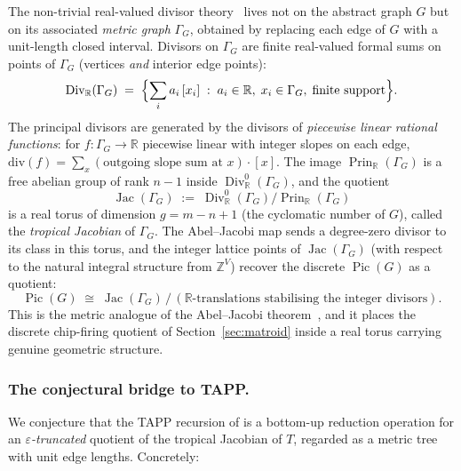 \documentclass[11pt]{article}
\newcommand{\Z}{\mathbb{Z}}
\newcommand{\R}{\mathbb{R}}
\newcommand{\Div}{\operatorname{Div}^0}
\begin{document}
The non-trivial real-valued divisor theory~\cite{baker2007riemann,mikhalkin2008tropical}
lives not on the abstract graph $G$ but on its associated
\emph{metric graph} $\Gamma_G$, obtained by replacing each edge of $G$
with a unit-length closed interval. Divisors on $\Gamma_G$ are
finite real-valued formal sums on points of $\Gamma_G$
(vertices \emph{and} interior edge points):
\[
  \operatorname{Div}_\R(\Gamma_G) \;=\;
  \Bigl\{ \sum_i a_i\, [x_i] \;:\;
  a_i \in \R,\; x_i \in \Gamma_G,\; \text{finite support}\Bigr\}.
\]
The principal divisors are generated by the divisors of \emph{piecewise
linear rational functions}: for $f : \Gamma_G \to \R$ piecewise linear
with integer slopes on each edge,
$\mathrm{div}(f) = \sum_{x} (\text{outgoing slope sum at } x) \cdot [x]$.
The image $\operatorname{Prin}_\R(\Gamma_G)$ is a free abelian group of
rank $n-1$ inside $\Div_\R(\Gamma_G)$, and the quotient
\[
  \operatorname{Jac}(\Gamma_G) \;:=\;
  \Div_\R(\Gamma_G) / \operatorname{Prin}_\R(\Gamma_G)
\]
is a real torus of dimension $g = m - n + 1$ (the cyclomatic number of
$G$), called the \emph{tropical Jacobian} of $\Gamma_G$. The
Abel--Jacobi map sends a degree-zero divisor to its class in this
torus, and the integer lattice points of $\operatorname{Jac}(\Gamma_G)$
(with respect to the natural integral structure from $\Z^V$) recover
the discrete $\operatorname{Pic}(G)$ as a quotient:
\[
  \operatorname{Pic}(G) \;\cong\;
  \operatorname{Jac}(\Gamma_G)\, /\,
  (\R\text{-translations stabilising the integer divisors}).
\]
This is the metric analogue of the Abel--Jacobi
theorem~\cite{baker2007riemann}, and it places the discrete chip-firing
quotient of Section~\ref{sec:matroid} inside a real torus carrying
genuine geometric structure.

\subsubsection*{The conjectural bridge to TAPP.}

We conjecture that the TAPP recursion of \cite{akitaya2026bud} is a
bottom-up reduction operation for an \emph{$\varepsilon$-truncated}
quotient of the tropical Jacobian of $T$, regarded as a metric tree
with unit edge lengths. Concretely:
\end{document}
